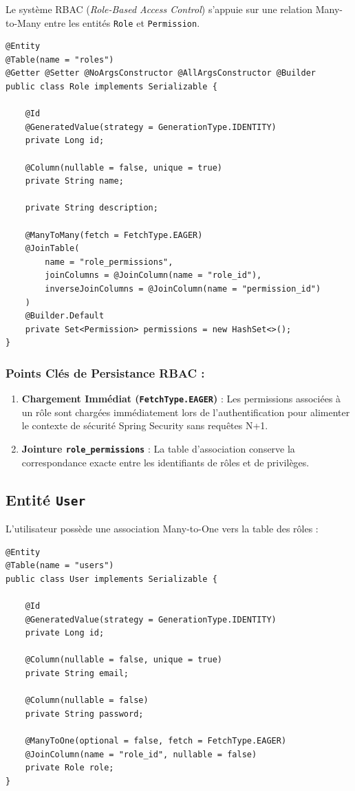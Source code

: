 \documentclass[11pt,a4paper]{article}
\begin{document}
Le système RBAC (\textit{Role-Based Access Control}) s'appuie sur une relation Many-to-Many entre les entités \texttt{Role} et \texttt{Permission}.

\begin{lstlisting}[language=CustomJava, caption={Mapping JPA de l'entite Role.}]
@Entity
@Table(name = "roles")
@Getter @Setter @NoArgsConstructor @AllArgsConstructor @Builder
public class Role implements Serializable {

    @Id
    @GeneratedValue(strategy = GenerationType.IDENTITY)
    private Long id;

    @Column(nullable = false, unique = true)
    private String name;

    private String description;

    @ManyToMany(fetch = FetchType.EAGER)
    @JoinTable(
        name = "role_permissions",
        joinColumns = @JoinColumn(name = "role_id"),
        inverseJoinColumns = @JoinColumn(name = "permission_id")
    )
    @Builder.Default
    private Set<Permission> permissions = new HashSet<>();
}
\end{lstlisting}

\subsubsection{Points Clés de Persistance RBAC :}
\begin{enumerate}
    \item \textbf{Chargement Immédiat (\texttt{FetchType.EAGER})} : Les permissions associées à un rôle sont chargées immédiatement lors de l'authentification pour alimenter le contexte de sécurité Spring Security sans requêtes N+1.
    \item \textbf{Jointure \texttt{role\_permissions}} : La table d'association conserve la correspondance exacte entre les identifiants de rôles et de privilèges.
\end{enumerate}

\subsection{Entité \texttt{User}}

L'utilisateur possède une association Many-to-One vers la table des rôles :

\begin{lstlisting}[language=CustomJava, caption={Extrait de l'entite User.}]
@Entity
@Table(name = "users")
public class User implements Serializable {

    @Id
    @GeneratedValue(strategy = GenerationType.IDENTITY)
    private Long id;

    @Column(nullable = false, unique = true)
    private String email;

    @Column(nullable = false)
    private String password;

    @ManyToOne(optional = false, fetch = FetchType.EAGER)
    @JoinColumn(name = "role_id", nullable = false)
    private Role role;
}
\end{lstlisting}
\end{document}
